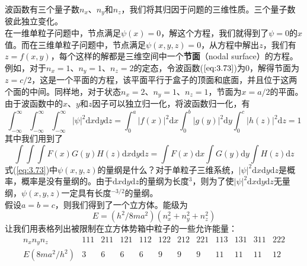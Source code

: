 	\indent 波函数有三个量子数$n_x$、$n_y$和$n_z$，我们将其归因于问题的三维性质。三个量子数彼此独立变化。\\
	\indent 在一维单粒子问题中，节点满足$\psi\left(x\right)=0$，解这个方程，我们就得到了$\psi = 0$的$x$值。而在三维单粒子问题中，节点满足$\psi\left(x,y,z\right) = 0$，从方程中解出$z$，我们有$z=f\left(x,y\right)$，每个这样的解都是三维空间中一个\textbf{节面}（nodal surface）的方程。例如，对于$n_x=1$、$n_y=1$、$n_z=2$的定态，令波函数($\ref{eq:3.73}$)为0，解得节面为$z=c/2$，这是一个平面的方程，该平面平行于盒子的顶面和底面，并且位于这两个面的中间。同样地，对于状态$n_x=2$、$n_y=1$、$n_z=1$，节面为$x=a/2$的平面。\\
	\indent 由于波函数中的$x$、$y$和$z$因子可以独立归一化，将波函数归一化，有
	\begin{equation*}
		\int_{-\infty}^{\infty}\int_{-\infty}^{\infty}\int_{-\infty}^{\infty}\left|\psi\right|^2\mathrm{d}x\mathrm{d}y\mathrm{d}z = \int_{0}^{a}\left|f\left(x\right)\right|^2\mathrm{d}x\int_{0}^{b}\left|g\left(y\right)\right|^2\mathrm{d}y\int_{0}^{c}\left|h\left(z\right)\right|^2\mathrm{d}z=1
	\end{equation*}
	其中我们用到了
	\begin{equation}
		\boxed{
			\int\int\int F\left(x\right)G\left(y\right)H\left(z\right)\mathrm{d}x\mathrm{d}y\mathrm{d}z = \int F\left(x\right)\mathrm{d}x\int G\left(y\right)\mathrm{d}y\int H\left(z\right)\mathrm{d}z
		}
		\label{eq:3.74}
	\end{equation}
	\indent 式(\ref{eq:3.73})中$\psi\left(x,y,z\right)$的量纲是什么？对于单粒子三维系统，$\left|\psi\right|^2\mathrm{d}x\mathrm{d}y\mathrm{d}z$是概率，概率是没有量纲的。由于$\mathrm{d}x\mathrm{d}y\mathrm{d}z$的量纲为长度$^3$，则为了使$\left|\psi\right|^2\mathrm{d}x\mathrm{d}y\mathrm{d}z$无量纲，$\psi\left(x,y,z\right)$一定具有长度$^{-3/2}$的量纲。\\
	\indent 假设$a=b=c$，则我们得到了一个立方体。能级为
	\begin{equation}
		E = \left(h^2/8ma^2\right)\left(n_x^2+n_y^2+n_z^2\right)
		\label{eq:3.75}
	\end{equation}
	让我们用表格列出被限制在立方体势箱中粒子的一些允许能量：
	\begin{equation*}
		\begin{array}{c|c|c|c|c|c|c|c|c|c|c|c}
			n_xn_yn_z & 111 & 211 & 121 & 112 & 122 & 212 & 221 & 113 & 131 & 311 & 222 \\
			\hline E\left(8ma^2/h^2\right) & 3 & 6 & 6 & 6 & 9 & 9 & 9 & 11 & 11 & 11 & 12
		\end{array}
	\end{equation*}
